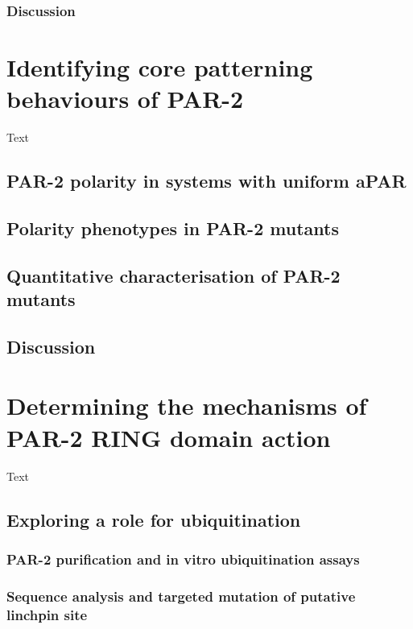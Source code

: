 \documentclass[11pt]{"article"}
\begin{document}
\clearpage
\subsubsection{Discussion}

\clearpage
\section{Identifying core patterning behaviours of PAR-2}

Text

\subsection{PAR-2 polarity in systems with uniform aPAR}

\subsection{Polarity phenotypes in PAR-2 mutants}

\subsection{Quantitative characterisation of PAR-2 mutants}

\subsection{Discussion}

\clearpage
\section{Determining the mechanisms of PAR-2 RING domain action}

Text

\subsection{Exploring a role for ubiquitination}
\subsubsection{PAR-2 purification and in vitro ubiquitination assays}
\subsubsection{Sequence analysis and targeted mutation of putative linchpin site}
\end{document}
